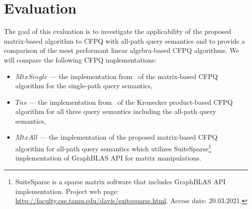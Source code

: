 \section{Evaluation}
The goal of this evaluation is to investigate the applicability of the proposed matrix-based algorithm to CFPQ with all-path query semantics and to provide a comparison of the most performant linear algebra-based CFPQ algorithms. We will compare the following CFPQ implementations:
\begin{itemize}
	\item $MtxSingle$ --- the implementation from~\cite{10.1145/3398682.3399163} of the matrix-based CFPQ algorithm for the single-path query semantics,
	\item $Tns$ --- the implementation from~\cite{kron} of the Kronecker product-based CFPQ algorithm for all three query semantics including the all-path query semantics,
	\item $MtxAll$ --- the implementation of the proposed matrix-based CFPQ algorithm for all-path query semantics which utilizes SuiteSparse\footnote{SuiteSparse is a sparse matrix software that includes GraphBLAS API implementation. Project web page: \url{http://faculty.cse.tamu.edu/davis/suitesparse.html}. Access date: 20.03.2021.}~\cite{Davis2018Algorithm9S} implementation of GraphBLAS API for matrix manipulations.
\end{itemize}
